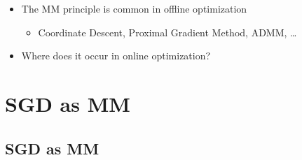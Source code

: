 \documentclass{beamer}
\begin{document}
\begin{frame}
  \begin{itemize}
    \item The MM principle is common in offline optimization
    \begin{itemize}
      \item Coordinate Descent, Proximal Gradient Method, ADMM, \ldots
    \end{itemize}
    \item Where does it occur in online optimization?
  \end{itemize}
\end{frame}



\section{SGD as MM}

\subsection{SGD as MM}
\end{document}
